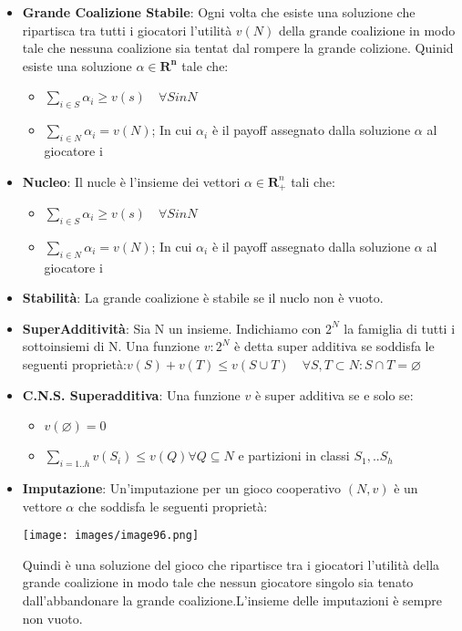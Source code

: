 \documentclass{article}
\theoremstyle{definition}
\theoremstyle{remark}
\begin{document}
\begin{itemize}
\begin{itemize}
        \item \textbf{Grande Coalizione Stabile}: Ogni volta che esiste una soluzione che ripartisca tra tutti i giocatori l'utilità $v(N)$ della grande coalizione in modo tale che nessuna coalizione sia tentat dal rompere la grande colizione. Quinid esiste una soluzione $\alpha\in\mathbf{R^n}$ tale che:\begin{itemize}
            \item $\sum_{i\in S}\alpha_i\geq v(s)\quad\forall S in N$
            \item $\sum_{i\in N}\alpha_i=v(N)$;
            In cui $\alpha_i$ è il payoff assegnato dalla soluzione $\alpha$ al giocatore i
        \end{itemize}
        \item\textbf{Nucleo}: Il nucle è l'insieme dei vettori $\alpha\in\mathbf{R}_{+}^{n}$ tali che:\begin{itemize}
            \item $\sum_{i\in S}\alpha_i\geq v(s)\quad\forall S in N$
            \item $\sum_{i\in N}\alpha_i=v(N)$;
            In cui $\alpha_i$ è il payoff assegnato dalla soluzione $\alpha$ al giocatore i
        \end{itemize}
        \item\textbf{Stabilità}: La grande coalizione è stabile se il nuclo non è vuoto.
        \item\textbf{SuperAdditività}: Sia N un insieme. Indichiamo con $2^N$ la famiglia di tutti i sottoinsiemi di N. Una funzione $v:2^N$ è detta super additiva se soddisfa le seguenti proprietà:$v(S)+v(T)\leq v(S\cup T)\quad\forall S,T\subset N:S\cap T=\varnothing$
        \item\textbf{C.N.S. Superadditiva}: Una funzione $v$ è super additiva se e solo se:\begin{itemize}
            \item $v(\varnothing)=0$
            \item $\sum_{i=1..h}v(S_i)\leq v(Q) \forall Q \subseteq N$ e partizioni in classi $S_1,..S_h$
        \end{itemize}
        \item \textbf{Imputazione}: Un'imputazione per un gioco cooperativo $(N,v)$ è un vettore $\alpha$ che soddisfa le seguenti proprietà:\begin{center}
            \texttt{[image: images/image96.png]}
        \end{center} Quindi è una soluzione del gioco che ripartisce tra i giocatori l'utilità della grande coalizione in modo tale che nessun giocatore singolo sia tenato dall'abbandonare la grande coalizione.L'insieme delle imputazioni è sempre non vuoto.

\end{itemize}
\end{itemize}
\end{document}
